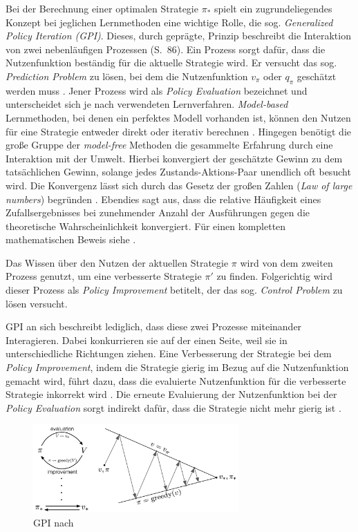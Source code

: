 Bei der Berechnung einer optimalen Strategie $\pi_*$ spielt ein zugrundeliegendes Konzept  bei jeglichen Lernmethoden eine wichtige Rolle, die sog. \textit{Generalized Policy Iteration (GPI)}. Dieses, durch \cite{Sutton1998} geprägte, Prinzip beschreibt die Interaktion von zwei nebenläufigen Prozessen (S.~86). Ein Prozess sorgt dafür, dass die Nutzenfunktion beständig für die aktuelle Strategie wird. Er versucht das sog. \textit{Prediction Problem} zu lösen, bei dem die Nutzenfunktion $v_{\pi}$ oder $q_{\pi}$ geschätzt werden muss \cite[S.~18]{Wiering}. Jener Prozess wird als \textit{Policy Evaluation} bezeichnet und unterscheidet sich je nach verwendeten Lernverfahren. \textit{Model-based} Lernmethoden, bei denen ein perfektes Modell vorhanden ist, können den Nutzen für eine Strategie entweder direkt oder iterativ berechnen \cite[S.~18]{Wiering}. Hingegen benötigt die große Gruppe der \textit{model-free} Methoden die gesammelte Erfahrung durch eine Interaktion mit der Umwelt. Hierbei konvergiert der geschätzte Gewinn zu dem tatsächlichen Gewinn, solange jedes Zustands-Aktions-Paar unendlich oft besucht wird. Die Konvergenz lässt sich durch das \glqq Gesetz der großen Zahlen\grqq{} (\textit{Law of large numbers}) begründen \cite[S.~94]{Sutton1998}.
Ebendies sagt aus, dass die relative Häufigkeit eines Zufallsergebnisses bei zunehmender Anzahl der Ausführungen gegen die theoretische Wahrscheinlichkeit konvergiert. Für einen kompletten mathematischen Beweis siehe \cite[S.~181-189]{dekking2006modern}.
\par 
Das Wissen über den Nutzen der aktuellen Strategie $\pi$ wird von dem zweiten Prozess genutzt, um eine verbesserte Strategie $\pi'$ zu finden. Folgerichtig wird dieser Prozess als \textit{Policy Improvement} betitelt, der das sog. \textit{Control Problem} zu lösen versucht.
\par 
GPI an sich beschreibt lediglich, dass diese zwei Prozesse miteinander Interagieren. Dabei konkurrieren sie auf der einen Seite, weil sie in unterschiedliche Richtungen ziehen. Eine Verbesserung der Strategie bei dem \textit{Policy Improvement}, indem die Strategie gierig im Bezug auf die Nutzenfunktion gemacht wird, führt dazu, dass die evaluierte Nutzenfunktion für die verbesserte Strategie inkorrekt wird \cite[S.~86]{Sutton1998}. Die erneute Evaluierung der Nutzenfunktion bei der \textit{Policy Evaluation} sorgt indirekt dafür, dass die Strategie nicht mehr gierig ist \cite[S.~86]{Sutton1998}.
\par 
\begin{figure}[H]
    \centering
    \includegraphics[width=0.7\textwidth]{images/gpi.jpg}
    \caption{GPI nach \cite[S.~86f]{Sutton1998}}
    \label{fig:GPI}
\end{figure}

